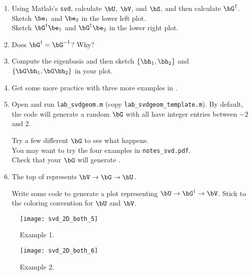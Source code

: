 \documentclass[11pt,titlepage,fleqn]{article}
\begin{document}
\begin{enumerate}
\item Using Matlab's \verb+svd+, calculate $\bU$, $\bV$, and $\bS$, and then calculate $\bG^{\dagger}$. \\
Sketch $\be_1$ and $\be_2$ in the lower left plot. \\
Sketch $\bG^{\dagger}\be_1$ and $\bG^{\dagger}\be_2$ in the lower right plot.

\item Does $\bG^{\dagger} = \bG^{-1}$? Why?

\item Compute the eigenbasis and then sketch $\{\bh_1,\bh_2\}$ and $\{\bG\bh_1,\bG\bh_2\}$ in your plot.

\item Get some more practice with three more examples in .

\item Open and run \verb+lab_svdgeom.m+ (copy \verb+lab_svdgeom_template.m+). By default, the code will generate a random $\bG$ with all have integer entries between $-2$ and 2.

Try a few different $\bG$ to see what happens. \\
You may want to try the four examples in \verb+notes_svd.pdf+. \\
Check that your $\bG$ will generate .

\item The top of  represents $\bV \rightarrow \bG \rightarrow \bU$.

Write some code to generate a plot representing $\bU \rightarrow \bG^{\dagger} \rightarrow \bV$. Stick to the coloring convention for $\bU$ and $\bV$.

\end{enumerate}




\clearpage\pagebreak
\begin{figure}
\hspace{-1cm}
\texttt{[image: svd\_2D\_both\_5]}
\caption[]
{{
Example 1.
\label{fig:ex1}
}}
\end{figure}

\clearpage\pagebreak
\begin{figure}
\hspace{-1cm}
\texttt{[image: svd\_2D\_both\_6]}
\caption[]
{{
Example 2.
\label{fig:ex2}
}}
\end{figure}
\end{document}

